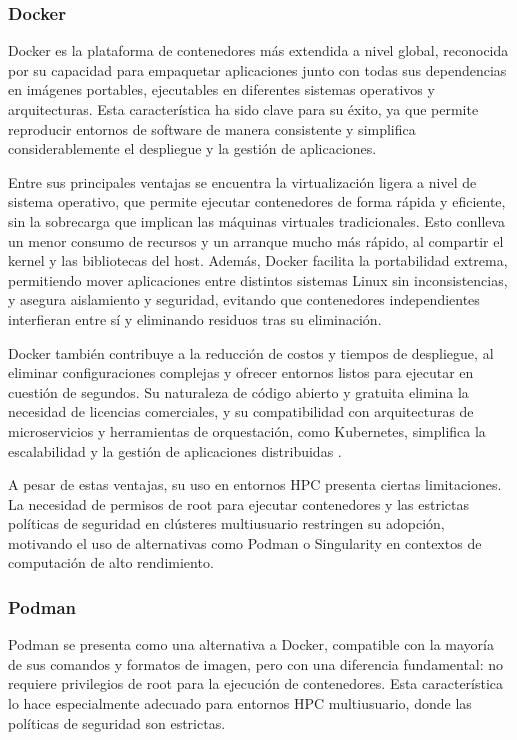 \subsubsection{Docker}

Docker es la plataforma de contenedores más extendida a nivel global, reconocida por su capacidad para empaquetar aplicaciones junto con todas sus dependencias en imágenes portables, ejecutables en diferentes sistemas operativos y arquitecturas. Esta característica ha sido clave para su éxito, ya que permite reproducir entornos de software de manera consistente y simplifica considerablemente el despliegue y la gestión de aplicaciones.

Entre sus principales ventajas se encuentra la virtualización ligera a nivel de sistema operativo, que permite ejecutar contenedores de forma rápida y eficiente, sin la sobrecarga que implican las máquinas virtuales tradicionales. Esto conlleva un menor consumo de recursos y un arranque mucho más rápido, al compartir el kernel y las bibliotecas del host. Además, Docker facilita la portabilidad extrema, permitiendo mover aplicaciones entre distintos sistemas Linux sin inconsistencias, y asegura aislamiento y seguridad, evitando que contenedores independientes interfieran entre sí y eliminando residuos tras su eliminación.

Docker también contribuye a la reducción de costos y tiempos de despliegue, al eliminar configuraciones complejas y ofrecer entornos listos para ejecutar en cuestión de segundos. Su naturaleza de código abierto y gratuita elimina la necesidad de licencias comerciales, y su compatibilidad con arquitecturas de microservicios y herramientas de orquestación, como Kubernetes, simplifica la escalabilidad y la gestión de aplicaciones distribuidas \cite{Bhatia2017THERT}.

A pesar de estas ventajas, su uso en entornos \acs{HPC} presenta ciertas limitaciones. La necesidad de permisos de root para ejecutar contenedores y las estrictas políticas de seguridad en clústeres multiusuario restringen su adopción, motivando el uso de alternativas como Podman o Singularity en contextos de computación de alto rendimiento.

\subsubsection{Podman}

Podman se presenta como una alternativa a Docker, compatible con la mayoría de sus comandos y formatos de imagen, pero con una diferencia fundamental: no requiere privilegios de root para la ejecución de contenedores. Esta característica lo hace especialmente adecuado para entornos \acs{HPC} multiusuario, donde las políticas de seguridad son estrictas.

